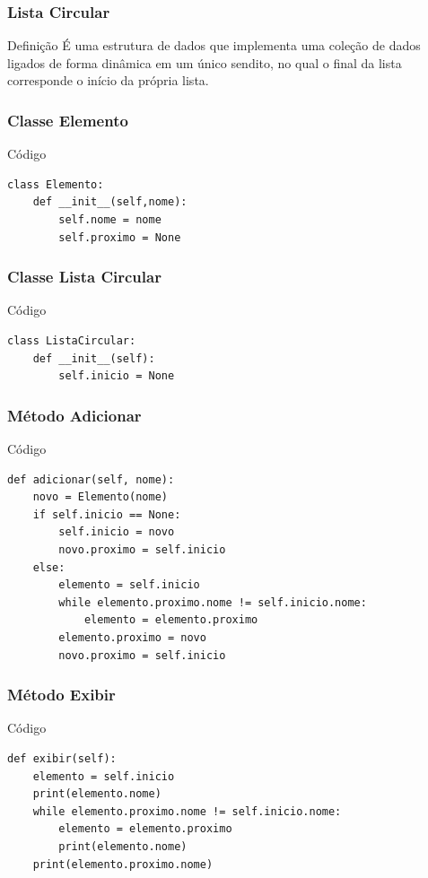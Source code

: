 \documentclass{beamer}
\begin{document}
\begin{frame}
\frametitle{Lista Circular}

\begin{block}{Definição}
	É uma estrutura de dados que implementa uma coleção de dados ligados de forma dinâmica em um único sendito, no qual o final da lista corresponde o início da própria lista.
\end{block}
\end{frame}

\begin{frame}[fragile]
\frametitle{Classe Elemento}

\begin{exampleblock}{Código}
	\begin{lstlisting}
class Elemento:
    def __init__(self,nome):
        self.nome = nome
        self.proximo = None
	\end{lstlisting}
\end{exampleblock}
\end{frame}

\begin{frame}[fragile]
\frametitle{Classe Lista Circular}

\begin{exampleblock}{Código}
\begin{lstlisting}
class ListaCircular:
    def __init__(self):
        self.inicio = None
\end{lstlisting}
\end{exampleblock}
\end{frame}

\begin{frame}[fragile]
\frametitle{Método Adicionar}

\begin{exampleblock}{Código}
\begin{lstlisting}
def adicionar(self, nome):
    novo = Elemento(nome)
    if self.inicio == None:
        self.inicio = novo
        novo.proximo = self.inicio
    else:
        elemento = self.inicio
        while elemento.proximo.nome != self.inicio.nome:
            elemento = elemento.proximo
        elemento.proximo = novo
        novo.proximo = self.inicio
\end{lstlisting}
\end{exampleblock}
\end{frame}

\begin{frame}[fragile]
\frametitle{Método Exibir}

\begin{exampleblock}{Código}
\begin{lstlisting}
def exibir(self):
    elemento = self.inicio
    print(elemento.nome)
    while elemento.proximo.nome != self.inicio.nome:
        elemento = elemento.proximo
        print(elemento.nome)
    print(elemento.proximo.nome)
\end{lstlisting}
\end{exampleblock}
\end{frame}
\end{document}
